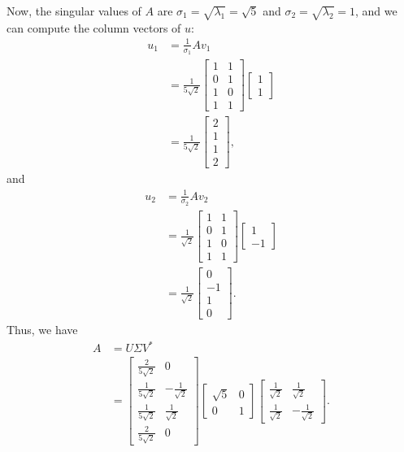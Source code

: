 \documentclass[10pt,a4paper]{article}
\theoremstyle{definition}
\begin{document}
Now, the singular values of $A$ are $\sigma_1 = \sqrt{\lambda_1} = \sqrt{5}$ and $\sigma_2 = \sqrt{\lambda_2} = 1$, and we can compute the column vectors of $u$:
\begin{align*}
u_1 &= \frac{1}{\sigma_1} A v_1\\
&= \frac{1}{5 \sqrt{2}} \begin{bmatrix}
1 & 1\\
0 & 1\\
1 & 0\\
1 & 1
\end{bmatrix} \begin{bmatrix}
1\\
1
\end{bmatrix}\\
&= \frac{1}{5 \sqrt{2}} \begin{bmatrix}
2\\
1\\
1\\
2
\end{bmatrix},
\end{align*}
and 
\begin{align*}
u_2 &= \frac{1}{\sigma_2} A v_2\\
&= \frac{1}{\sqrt{2}} \begin{bmatrix}
1 & 1\\
0 & 1\\
1 & 0\\
1 & 1
\end{bmatrix} \begin{bmatrix}
1\\
-1
\end{bmatrix}\\
&= \frac{1}{\sqrt{2}} \begin{bmatrix}
0\\
-1\\
1\\
0
\end{bmatrix}.
\end{align*}
Thus, we have
\begin{align*}
A &= U \Sigma V^*\\
&= \begin{bmatrix}
\frac{2}{5 \sqrt{2}} & 0\\
\frac{1}{5 \sqrt{2}} & -\frac{1}{\sqrt{2}}\\
\frac{1}{5 \sqrt{2}} & \frac{1}{\sqrt{2}}\\
\frac{2}{5 \sqrt{2}} & 0
\end{bmatrix} \begin{bmatrix}
\sqrt{5} & 0\\
0 & 1
\end{bmatrix} \begin{bmatrix}
\frac{1}{\sqrt{2}} & \frac{1}{\sqrt{2}}\\
\frac{1}{\sqrt{2}} & -\frac{1}{\sqrt{2}}
\end{bmatrix}.
\end{align*}
\end{document}
